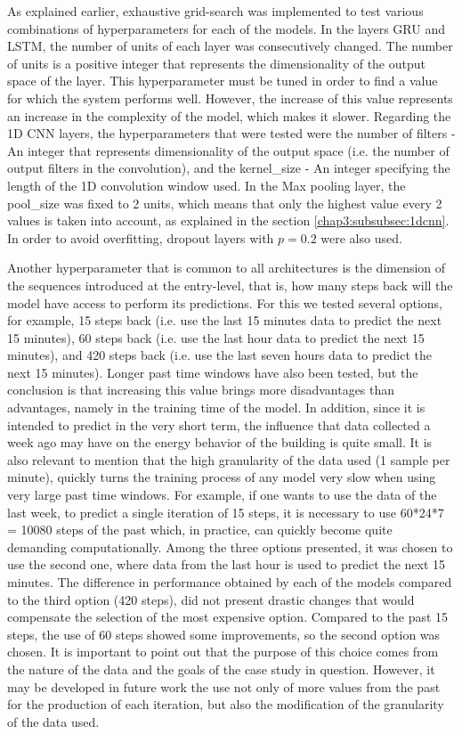 As explained earlier, exhaustive grid-search was implemented to test various combinations of hyperparameters for each of the models. In the layers \ac{GRU} and \ac{LSTM}, the number of units of each layer was consecutively changed.
The number of units is a positive integer that represents the dimensionality of the output space of the layer. This hyperparameter must be tuned in order to find a value for which the system performs well. However, the increase of this value represents an increase in the complexity of the model, which makes it slower. Regarding the \ac{1D CNN} layers, the hyperparameters that were tested were the number of filters - An integer that represents dimensionality of the output space (i.e. the number of output filters in the convolution), and the kernel\_size - An integer specifying the length of the 1D convolution window used. In the Max pooling layer, the pool\_size was fixed to 2 units, which means that only the highest value every 2 values is taken into account, as explained in the section \ref{chap3:subsubsec:1dcnn}. In order to avoid overfitting, dropout layers with $p=0.2$ were also used.

Another hyperparameter that is common to all architectures is the dimension of the sequences introduced at the entry-level, that is, how many steps back will the model have access to perform its predictions. For this we tested several options, for example, 15 steps back (i.e. use the last 15 minutes data to predict the next 15 minutes), 60 steps back (i.e. use the last hour data to predict the next 15 minutes), and 420 steps back (i.e. use the last seven hours data to predict the next 15 minutes). Longer past time windows have also been tested, but the conclusion is that increasing this value brings more disadvantages than advantages, namely in the training time of the model. In addition, since it is intended to predict in the very short term, the influence that data collected a week ago may have on the energy behavior of the building is quite small. It is also relevant to mention that the high granularity of the data used (1 sample per minute), quickly turns the training process of any model very slow when using very large past time windows. For example, if one wants to use the data of the last week, to predict a single iteration of 15 steps, it is necessary to use 60*24*7 = 10080 steps of the past which, in practice, can quickly become quite demanding computationally. Among the three options presented, it was chosen to use the second one, where data from the last hour is used to predict the next 15 minutes. The difference in performance obtained by each of the models compared to the third option (420 steps), did not present drastic changes that would compensate the selection of the most expensive option. Compared to the past 15 steps, the use of 60 steps showed some improvements, so the second option was chosen. It is important to point out that the purpose of this choice comes from the nature of the data and the goals of the case study in question. However, it may be developed in future work the use not only of more values from the past for the production of each iteration, but also the modification of the granularity of the data used.

